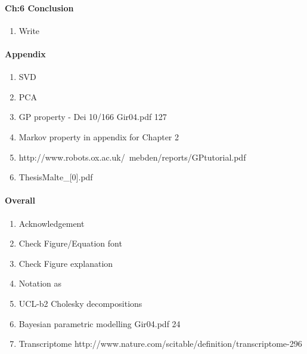 \documentclass[a4paper,10pt]{article}
\begin{document}
\paragraph{Ch:6 Conclusion}
\begin{enumerate}
 \item Write
\end{enumerate}

\paragraph{Appendix}
\begin{enumerate}
 \item SVD %
 \item PCA
 \item GP property - Dei 10/166  Gir04.pdf 127  %
 \item Markov property in appendix for Chapter 2 %
 \item http://www.robots.ox.ac.uk/~mebden/reports/GPtutorial.pdf
 \item ThesisMalte\_[0].pdf %
\end{enumerate}



\paragraph{Overall}
\begin{enumerate}
 \item Acknowledgement %
 \item Check Figure/Equation font
 \item Check Figure explanation
 \item Notation as  %
 \item UCL-b2 Cholesky decompositions %
 \item Bayesian parametric modelling Gir04.pdf 24 %
 \item Transcriptome http://www.nature.com/scitable/definition/transcriptome-296
\end{enumerate}
\end{document}
